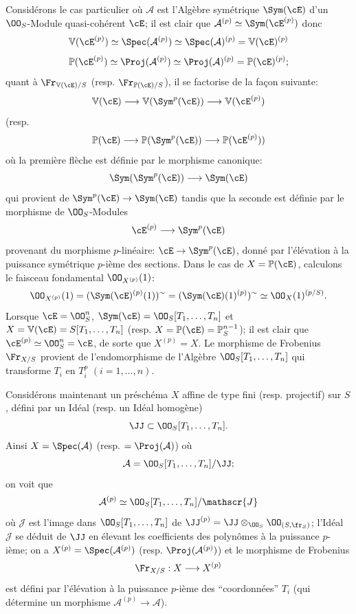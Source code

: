 Considérons le cas particulier où $\mathcal{A}$ est l'Algèbre symétrique $\Sym(\cE)$ d'un $\OO_S$-Module quasi-cohérent $\cE$; il est clair que $\mathcal{A}^{(p)}\simeq\Sym(\cE^{(p)})$ donc
\[
\mathbb{V}(\cE^{(p)})\simeq\Spec(\mathcal{A}^{(p)})\simeq\Spec(\mathcal{A})^{(p)}=\mathbb{V}(\cE)^{(p)}
\]
\[
\mathbb{P}(\cE^{(p)})\simeq\Proj(\mathcal{A}^{(p)})\simeq\Proj(\mathcal{A})^{(p)}=\mathbb{P}(\cE)^{(p)};
\]
quant à $\Fr_{\mathbb{V}(\cE)/S}$ (resp. $\Fr_{\mathbb{P}(\cE)/S}$), il se factorise de la façon suivante:
\[
\mathbb{V}(\cE)\longrightarrow \mathbb{V}(\Sym^p(\cE))\longrightarrow \mathbb{V}(\cE^{(p)})
\]
(resp.
\[
\mathbb{P}(\cE)\longrightarrow \mathbb{P}(\Sym^p(\cE))\longrightarrow \mathbb{P}(\cE^{(p)}))
\]
où la
première flèche est définie par le morphisme canonique:
\[
\Sym(\Sym^p(\cE))\longrightarrow \Sym(\cE)
\]
qui provient de $\Sym^p(\cE)\to\Sym(\cE)$ tandis que la seconde est définie par le morphisme de $\OO_S$-Modules
\[
\cE^{(p)}\longrightarrow \Sym^p(\cE)
\]
provenant du morphisme $p$-linéaire: $\cE\to\Sym^p(\cE)$, donné par l'élévation à la puissance symétrique $p$-ième des sections. Dans le cas de $X=\mathbb{P}(\cE)$, calculons le faisceau fondamental $\OO_{X^{(p)}}(1)$:
\[
\OO_{X^{(p)}}(1)=(\Sym(\cE)^{(p)}(1))^{\sim}
=(\Sym(\cE)(1)^{(p)})^{\sim}
\simeq \OO_X(1)^{(p/S)}.
\]
Lorsque $\cE=\OO_S^n$, $\Sym(\cE)=\OO_S[T_1,\ldots,T_n]$ et $X=\mathbb{V}(\cE)=S[T_1,\ldots,T_n]$ (resp. $X=\mathbb{P}(\cE)=\mathbb{P}_S^{n-1}$); il est clair que $\cE^{(p)}\simeq\OO_S^n=\cE$, de sorte que $X^{(p)}=X$. Le morphisme de Frobenius $\Fr_{X/S}$ provient de l'endomorphisme de l'Algèbre $\OO_S[T_1,\ldots,T_n]$ qui transforme $T_i$ en $T_i^p$ $(i=1,\ldots,n)$.

Considérons maintenant un préschéma $X$ affine de type fini (resp. projectif) sur $S$, défini par un Idéal (resp. un Idéal homogène)
\[
\JJ\subset \OO_S[T_1,\ldots,T_n].
\]
Ainsi $X=\Spec(\mathcal{A})$ (resp. $=\Proj(\mathcal{A})$) où
\[
\mathcal{A}=\OO_S[T_1,\ldots,T_n]/\JJ;
\]
on voit que
\[
\mathcal{A}^{(p)}\simeq \OO_S[T_1,\ldots,T_n]/\mathscr{J}
\]
où $\mathscr{J}$ est l'image dans $\OO_S[T_1,\ldots,T_n]$ de $\JJ^{(p)}=\JJ\otimes_{\OO_S}\OO_{(S,\fr_S)}$; l'Idéal $\mathscr{J}$ se déduit de $\JJ$ en élevant les coefficients des polynômes à la puissance $p$-ième; on a $X^{(p)}=\Spec(\mathcal{A}^{(p)})$ (resp. $\Proj(\mathcal{A}^{(p)})$) et le
morphisme de Frobenius
\[
\Fr_{X/S}:X\longrightarrow X^{(p)}
\]
est défini par l'élévation à la puissance $p$-ième des ``coordonnées'' $T_i$ (qui détermine un morphisme $\mathcal{A}^{(p)}\to\mathcal{A}$).


